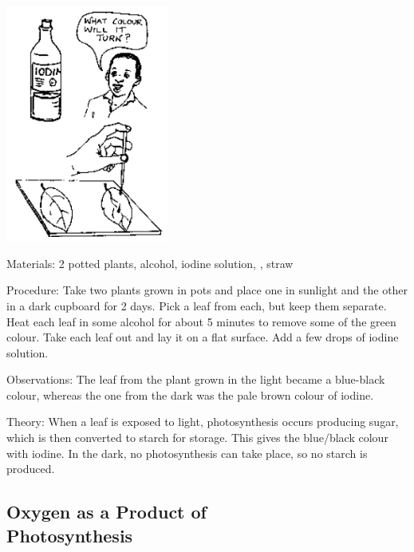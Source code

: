 \begin{multicols}{2}
\begin{center}
\includegraphics[width=0.4\textwidth]{./img/source/photo-starch.png}
\end{center}

\begin{description*}
\item[Materials:]{2 potted plants, alcohol, iodine solution, , straw}
\item[Procedure:]{Take two plants grown in pots and place one in sunlight and the other in a dark cupboard
for 2 days. Pick a leaf from each, but keep them separate. Heat each leaf in some alcohol for about 5 minutes to remove some of the green colour. Take each leaf out and lay it on
a flat surface. Add a few drops of iodine solution.}
\item[Observations:]{The leaf from the plant grown in the light became a blue-black colour, whereas the one
from the dark was the pale brown colour of iodine.}
\item[Theory:]{When a leaf is exposed to light, photosynthesis occurs producing sugar, which is then
converted to starch for storage. This gives the blue/black colour with iodine. In the dark, no
photosynthesis can take place, so no starch is produced.}
\end{description*}

\vfill
\columnbreak

\subsection{Oxygen as a Product of \hfill \\ Photosynthesis} %


\end{multicols}
